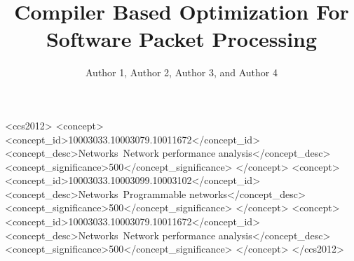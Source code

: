 \documentclass[sigconf]{acmart}
\begin{document}
\title{Compiler Based Optimization For Software Packet Processing}

\author{Author 1, Author 2, Author 3, and Author 4}


%
%
\begin{CCSXML}
<ccs2012>
<concept>
<concept_id>10003033.10003079.10011672</concept_id>
<concept_desc>Networks~Network performance analysis</concept_desc>
<concept_significance>500</concept_significance>
</concept>
<concept>
<concept_id>10003033.10003099.10003102</concept_id>
<concept_desc>Networks~Programmable networks</concept_desc>
<concept_significance>500</concept_significance>
</concept>
<concept>
<concept_id>10003033.10003079.10011672</concept_id>
<concept_desc>Networks~Network performance analysis</concept_desc>
<concept_significance>500</concept_significance>
</concept>
</ccs2012>
\end{CCSXML}
\maketitle






\end{document}
